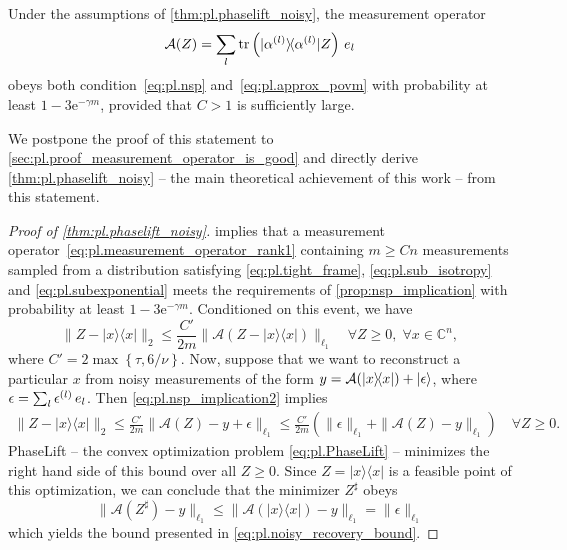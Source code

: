 \begin{proposition} \label{prop:pl.nsp}
  Under the assumptions of \cref{thm:pl.phaselift_noisy}, the measurement operator
  \[
    \label{eq:pl.measurement_operator_rank1}
    \mathcal{A}(Z) = \sum_l \tr \left(\ketbra{\alpha\ind{l}}  Z\right) \, {e_l}
  \]
  obeys both condition~\eqref{eq:pl.nsp} and~\eqref{eq:pl.approx_povm} with probability at least $1- 3\mathrm{e}^{-\gamma m}$, provided that $C >1$ is sufficiently large.
\end{proposition}

We postpone the proof of this statement to \cref{sec:pl.proof_measurement_operator_is_good} and directly derive \cref{thm:pl.phaselift_noisy} -- the main theoretical achievement of this work -- from this statement.

\begin{proof}[Proof of \cref{thm:pl.phaselift_noisy}]
   implies that a measurement operator~\eqref{eq:pl.measurement_operator_rank1} containing $m \geq C n$ measurements sampled from a distribution satisfying \eqref{eq:pl.tight_frame}, \eqref{eq:pl.sub_isotropy} and \eqref{eq:pl.subexponential} meets the requirements of \cref{prop:nsp_implication} with probability at least $1-3 \mathrm{e}^{-\gamma m}$.
  Conditioned on this event, we have
  \[
  \|  Z - |{x} \rangle \! \langle {x}| \|_2 \leq \frac{C'}{2m}  \| \mathcal{A}( Z - |{x} \rangle \! \langle {x}|) \|_{\ell_1} \quad \forall  Z \geq 0,\; \forall {x} \in \mathbb{C}^n,
  \label{eq:pl.nsp_implication2}
  \]
  where $C' = 2 \max \left\{\tau, 6/\nu \right\}$.
  Now, suppose that we want to reconstruct a particular ${x}$ from noisy measurements of the form ${y} = \mathcal{A} (|{x} \rangle \! \langle {x}|) + \ket{\epsilon}$, where ${\epsilon} = \sum_l \epsilon^{(l)} \, {e_l}$.
  Then \cref{eq:pl.nsp_implication2} implies
  \begin{align}
    \|  Z - |{x} \rangle \! \langle {x}| \|_2 \leq \frac{C'}{2m} \| \mathcal{A}( Z) - {y} + {\epsilon} \|_{\ell_1}
    \leq \frac{C'}{2m} \left( \| {\epsilon} \|_{\ell_1} + \| \mathcal{A}( Z) - {y} \|_{\ell_1} \right)\quad \forall  Z \geq 0.
  \end{align}
  PhaseLift -- the convex optimization problem \eqref{eq:pl.PhaseLift} -- minimizes the right hand side of this bound over all $ Z \geq 0$. Since $ Z = |{x} \rangle \! \langle {x}|$ is a feasible point of this optimization, we can conclude that the minimizer $ Z^\sharp$ obeys
  \[
  \| \mathcal{A}( Z^\sharp) - {y} \|_{\ell_1} \leq \| \mathcal{A}(|{x} \rangle \! \langle {x}|)-{y} \|_{\ell_1} = \| {\epsilon} \|_{\ell_1}
  \]
  which yields the bound presented in \eqref{eq:pl.noisy_recovery_bound}.
\end{proof}


